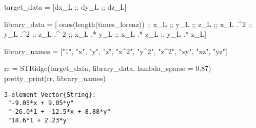 \documentclass[
]{article}
\newenvironment{Shaded}{\begin{snugshade}}{\end{snugshade}}
\newcommand{\FloatTok}[1]{\textcolor[rgb]{0.68,0.00,0.00}{#1}}
\newcommand{\FunctionTok}[1]{\textcolor[rgb]{0.28,0.35,0.67}{#1}}
\newcommand{\NormalTok}[1]{\textcolor[rgb]{0.00,0.23,0.31}{#1}}
\newcommand{\OperatorTok}[1]{\textcolor[rgb]{0.37,0.37,0.37}{#1}}
\newcommand{\StringTok}[1]{\textcolor[rgb]{0.13,0.47,0.30}{#1}}
\begin{document}
\begin{Shaded}
\begin{Highlighting}[]
\NormalTok{target\_data }\OperatorTok{=}\NormalTok{ [dx\_L ;; dy\_L ;; dz\_L]}

\NormalTok{library\_data }\OperatorTok{=}\NormalTok{ [}
  \FunctionTok{ones}\NormalTok{(}\FunctionTok{length}\NormalTok{(times\_lorenz)) ;; }
\NormalTok{  x\_L ;; y\_L ;; z\_L ;; }
\NormalTok{  x\_L }\OperatorTok{.\^{}}\FloatTok{2}\NormalTok{ ;; y\_L }\OperatorTok{.\^{}}\FloatTok{2}\NormalTok{ ;; z\_L }\OperatorTok{.\^{}} \FloatTok{2}\NormalTok{ ;;}
\NormalTok{  x\_L }\OperatorTok{.*}\NormalTok{ y\_L ;; x\_L }\OperatorTok{.*}\NormalTok{ z\_L ;; y\_L }\OperatorTok{.*}\NormalTok{ z\_L]}

\NormalTok{library\_names }\OperatorTok{=}\NormalTok{ [}\StringTok{"1"}\NormalTok{, }
  \StringTok{"x"}\NormalTok{, }\StringTok{"y"}\NormalTok{, }\StringTok{"z"}\NormalTok{,}
  \StringTok{"x\^{}2"}\NormalTok{, }\StringTok{"y\^{}2"}\NormalTok{, }\StringTok{"z\^{}2"}\NormalTok{,}
  \StringTok{"xy"}\NormalTok{, }\StringTok{"xz"}\NormalTok{, }\StringTok{"yz"}\NormalTok{]}

\NormalTok{rr }\OperatorTok{=} \FunctionTok{STRidge}\NormalTok{(target\_data, library\_data, lambda\_sparse }\OperatorTok{=} \FloatTok{0.87}\NormalTok{)}
\FunctionTok{pretty\_print}\NormalTok{(rr, library\_names)}
\end{Highlighting}
\end{Shaded}

\begin{verbatim}
3-element Vector{String}:
 "-9.05*x + 9.05*y"
 "-26.0*1 + -12.5*x + 8.88*y"
 "18.6*1 + 2.23*y"
\end{verbatim}
\end{document}
